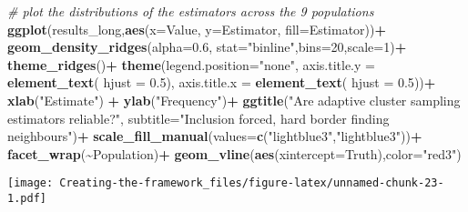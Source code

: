 \documentclass[
]{article}
\newenvironment{Shaded}{\begin{snugshade}}{\end{snugshade}}
\newcommand{\AttributeTok}[1]{\textcolor[rgb]{0.13,0.29,0.53}{#1}}
\newcommand{\CommentTok}[1]{\textcolor[rgb]{0.56,0.35,0.01}{\textit{#1}}}
\newcommand{\DecValTok}[1]{\textcolor[rgb]{0.00,0.00,0.81}{#1}}
\newcommand{\FloatTok}[1]{\textcolor[rgb]{0.00,0.00,0.81}{#1}}
\newcommand{\FunctionTok}[1]{\textcolor[rgb]{0.13,0.29,0.53}{\textbf{#1}}}
\newcommand{\NormalTok}[1]{#1}
\newcommand{\SpecialCharTok}[1]{\textcolor[rgb]{0.81,0.36,0.00}{\textbf{#1}}}
\newcommand{\StringTok}[1]{\textcolor[rgb]{0.31,0.60,0.02}{#1}}
\begin{document}
\begin{Shaded}
\begin{Highlighting}[]
\CommentTok{\# plot the distributions of the estimators across the 9 populations}
\FunctionTok{ggplot}\NormalTok{(results\_long,}\FunctionTok{aes}\NormalTok{(}\AttributeTok{x=}\NormalTok{Value, }\AttributeTok{y=}\NormalTok{Estimator, }\AttributeTok{fill=}\NormalTok{Estimator))}\SpecialCharTok{+}
  \FunctionTok{geom\_density\_ridges}\NormalTok{(}\AttributeTok{alpha=}\FloatTok{0.6}\NormalTok{, }\AttributeTok{stat=}\StringTok{"binline"}\NormalTok{,}\AttributeTok{bins=}\DecValTok{20}\NormalTok{,}\AttributeTok{scale=}\DecValTok{1}\NormalTok{)}\SpecialCharTok{+}
  \FunctionTok{theme\_ridges}\NormalTok{()}\SpecialCharTok{+}
  \FunctionTok{theme}\NormalTok{(}\AttributeTok{legend.position=}\StringTok{"none"}\NormalTok{,}
        \AttributeTok{axis.title.y =} \FunctionTok{element\_text}\NormalTok{( }\AttributeTok{hjust =} \FloatTok{0.5}\NormalTok{),}
        \AttributeTok{axis.title.x =} \FunctionTok{element\_text}\NormalTok{( }\AttributeTok{hjust =} \FloatTok{0.5}\NormalTok{))}\SpecialCharTok{+}
  \FunctionTok{xlab}\NormalTok{(}\StringTok{"Estimate"}\NormalTok{) }\SpecialCharTok{+}
  \FunctionTok{ylab}\NormalTok{(}\StringTok{"Frequency"}\NormalTok{)}\SpecialCharTok{+}
  \FunctionTok{ggtitle}\NormalTok{(}\StringTok{"Are adaptive cluster sampling estimators reliable?"}\NormalTok{,}
          \AttributeTok{subtitle=}\StringTok{"Inclusion forced, hard border finding neighbours"}\NormalTok{)}\SpecialCharTok{+}
  \FunctionTok{scale\_fill\_manual}\NormalTok{(}\AttributeTok{values=}\FunctionTok{c}\NormalTok{(}\StringTok{"lightblue3"}\NormalTok{,}\StringTok{"lightblue3"}\NormalTok{))}\SpecialCharTok{+}
  \FunctionTok{facet\_wrap}\NormalTok{(}\SpecialCharTok{\textasciitilde{}}\NormalTok{Population)}\SpecialCharTok{+}
  \FunctionTok{geom\_vline}\NormalTok{(}\FunctionTok{aes}\NormalTok{(}\AttributeTok{xintercept=}\NormalTok{Truth),}\AttributeTok{color=}\StringTok{"red3"}\NormalTok{)}
\end{Highlighting}
\end{Shaded}

\texttt{[image: Creating-the-framework\_files/figure-latex/unnamed-chunk-23-1.pdf]}
\end{document}
